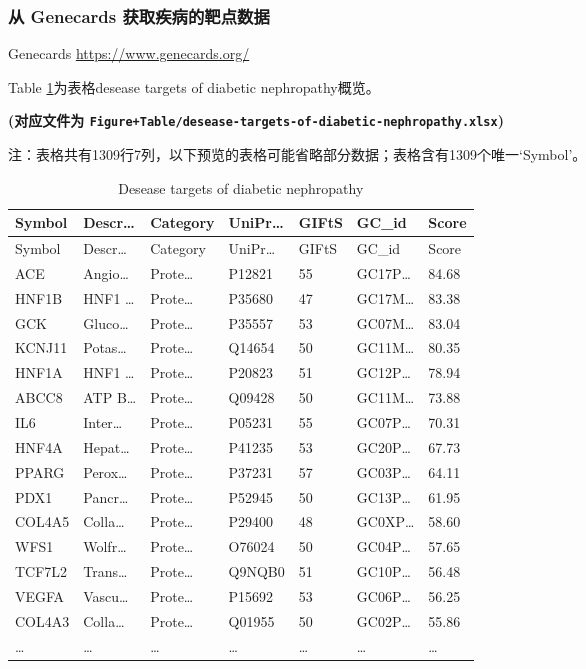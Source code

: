 \documentclass[
]{article}
\begin{document}
\hypertarget{ux4ece-genecards-ux83b7ux53d6ux75beux75c5ux7684ux9776ux70b9ux6570ux636e}{%
\subsubsection{从 Genecards 获取疾病的靶点数据}\label{ux4ece-genecards-ux83b7ux53d6ux75beux75c5ux7684ux9776ux70b9ux6570ux636e}}

Genecards \url{https://www.genecards.org/}

Table \ref{tab:desease-targets-of-diabetic-nephropathy}为表格desease targets of diabetic nephropathy概览。

\textbf{(对应文件为 \texttt{Figure+Table/desease-targets-of-diabetic-nephropathy.xlsx})}

\begin{center}\begin{tcolorbox}[colback=gray!10, colframe=gray!50, width=0.9\linewidth, arc=1mm, boxrule=0.5pt]注：表格共有1309行7列，以下预览的表格可能省略部分数据；表格含有1309个唯一`Symbol'。
\end{tcolorbox}
\end{center}

\begin{longtable}[]{@{}lllllll@{}}
\caption{\label{tab:desease-targets-of-diabetic-nephropathy}Desease targets of diabetic nephropathy}\tabularnewline
\toprule
Symbol & Descr\ldots{} & Category & UniPr\ldots{} & GIFtS & GC\_id & Score\tabularnewline
\midrule
\endfirsthead
\toprule
Symbol & Descr\ldots{} & Category & UniPr\ldots{} & GIFtS & GC\_id & Score\tabularnewline
\midrule
\endhead
ACE & Angio\ldots{} & Prote\ldots{} & P12821 & 55 & GC17P\ldots{} & 84.68\tabularnewline
HNF1B & HNF1 \ldots{} & Prote\ldots{} & P35680 & 47 & GC17M\ldots{} & 83.38\tabularnewline
GCK & Gluco\ldots{} & Prote\ldots{} & P35557 & 53 & GC07M\ldots{} & 83.04\tabularnewline
KCNJ11 & Potas\ldots{} & Prote\ldots{} & Q14654 & 50 & GC11M\ldots{} & 80.35\tabularnewline
HNF1A & HNF1 \ldots{} & Prote\ldots{} & P20823 & 51 & GC12P\ldots{} & 78.94\tabularnewline
ABCC8 & ATP B\ldots{} & Prote\ldots{} & Q09428 & 50 & GC11M\ldots{} & 73.88\tabularnewline
IL6 & Inter\ldots{} & Prote\ldots{} & P05231 & 55 & GC07P\ldots{} & 70.31\tabularnewline
HNF4A & Hepat\ldots{} & Prote\ldots{} & P41235 & 53 & GC20P\ldots{} & 67.73\tabularnewline
PPARG & Perox\ldots{} & Prote\ldots{} & P37231 & 57 & GC03P\ldots{} & 64.11\tabularnewline
PDX1 & Pancr\ldots{} & Prote\ldots{} & P52945 & 50 & GC13P\ldots{} & 61.95\tabularnewline
COL4A5 & Colla\ldots{} & Prote\ldots{} & P29400 & 48 & GC0XP\ldots{} & 58.60\tabularnewline
WFS1 & Wolfr\ldots{} & Prote\ldots{} & O76024 & 50 & GC04P\ldots{} & 57.65\tabularnewline
TCF7L2 & Trans\ldots{} & Prote\ldots{} & Q9NQB0 & 51 & GC10P\ldots{} & 56.48\tabularnewline
VEGFA & Vascu\ldots{} & Prote\ldots{} & P15692 & 53 & GC06P\ldots{} & 56.25\tabularnewline
COL4A3 & Colla\ldots{} & Prote\ldots{} & Q01955 & 50 & GC02P\ldots{} & 55.86\tabularnewline
\ldots{} & \ldots{} & \ldots{} & \ldots{} & \ldots{} & \ldots{} & \ldots{}\tabularnewline
\bottomrule
\end{longtable}
\end{document}
